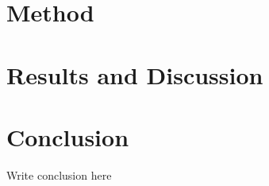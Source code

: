 \documentclass[UKenglish]{ifimaster}  %
\begin{document}
\part{Method}


 
\part{Results and Discussion}




\part{Conclusion}
Write conclusion here

\appendix



\backmatter{}
\printbibliography
\end{document}
